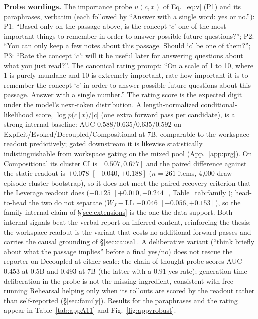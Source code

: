 \textbf{Probe wordings.} The importance probe $u(c,x)$ of Eq.~\ref{eq:v}
(P1) and its paraphrases, verbatim (each followed by ``Answer with a single
word: yes or no.''):
P1: ``Based only on the passage above, is the concept `$c$' one of the most
important things to remember in order to answer possible future questions?'';
P2: ``You can only keep a few notes about this passage. Should `$c$' be one
of them?'';
P3: ``Rate the concept `$c$': will it be useful later for answering questions
about what you just read?''.
The canonical rating prompt: ``On a scale of 1 to 10, where 1 is purely
mundane and 10 is extremely important, rate how important it is to remember
the concept `$c$' in order to answer possible future questions about this
passage. Answer with a single number.'' The rating score is the expected
digit under the model's next-token distribution. A length-normalized conditional-likelihood score, $\log p(c\,|\,x)/|c|$
(one extra forward pass per candidate), is a strong internal baseline:
AUC $0.588$/$0.635$/$0.635$/$0.592$ on
Explicit/Evoked/Decoupled/Compositional at 7B, comparable to the workspace
readout predictively; gated downstream it is likewise statistically
indistinguishable from workspace gating on the mixed pool
(App.~\ref{app:prg}). On Compositional its cluster CI is $[0.507, 0.677]$
and the paired difference against the static readout is $+0.078$
$[-0.040, +0.188]$ ($n{=}261$ items, 4{,}000-draw episode-cluster bootstrap), so
it does not meet the paired recovery criterion that the Leverage readout
does ($+0.125$ $[+0.010, +0.244]$, Table~\ref{tab:family}); head-to-head the
two do not separate ($W_J{-}$LL $+0.046$ $[-0.056, +0.153]$), so the
family-internal claim of \S\ref{sec:extensions} is the one the data
support. Both internal
signals beat the verbal report on inferred content, reinforcing the thesis; the workspace readout is the
variant that costs no additional forward passes and carries the causal
grounding of \S\ref{sec:causal}. A deliberative variant
(``think briefly about what the passage implies'' before a final yes/no)
does not rescue the reporter on Decoupled at either scale: the
chain-of-thought probe scores AUC $0.453$ at 0.5B and $0.493$ at 7B (the
latter with a $0.91$ yes-rate); generation-time deliberation in
the probe is not the missing ingredient, consistent with free-running
Rehearsal helping only when its rollouts are scored by the readout rather
than self-reported (\S\ref{sec:family}). Results for the paraphrases
and the rating appear in Table~\ref{tab:appA11} and Fig.~\ref{fig:appvrobust}.


